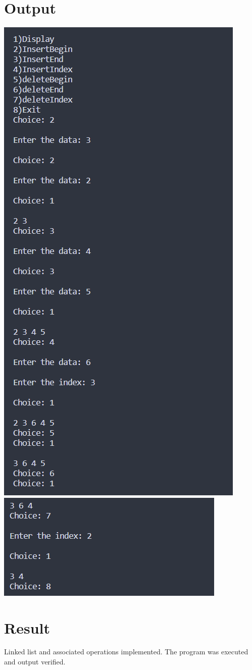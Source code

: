 \section{Output}
\includegraphics[]{Cycle_2/Outputs/LinkedList1.png}
\includegraphics[]{Cycle_2/Outputs/LinkedList2.png}

\section{Result}
Linked list and associated operations implemented. The program was executed and output
verified.